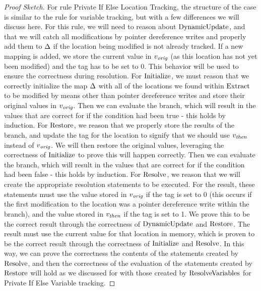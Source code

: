 \begin{proof}[Proof Sketch]
For rule Private If Else Location Tracking, the structure of the case is similar to the rule for variable tracking, but with a few differences we will discuss here. 
For this rule, we will need to reason about $\mathrm{DynamicUpdate}$, and that we will catch all modifications by pointer dereference writes and properly add them to $\Delta$ if the location being modified is not already tracked. If a new mapping is added, we store the current value in $v_\mathit{orig}$ (as this location has not yet been modified) and the tag has to be set to 0. This behavior will be used to ensure the correctness during resolution.
For $\mathrm{ Initialize}$, we must reason that we correctly initialize the map $\Delta$ with all of the locations we found within $\mathrm{ Extract}$ to be modified by means other than pointer dereference writes and store their original values in $v_\mathit{orig}$. 
Then we can evaluate the  branch, which will result in the values that are correct for if the condition had been true - this holds by induction. 
For $\mathrm{ Restore}$, we reason that we properly store the results of the  branch, and update the tag for the location to signify that we should use $v_\mathit{then}$ instead of $v_\mathit{orig}$. We will then restore the original values, leveraging the correctness of $\mathrm{ Initialize}$ to prove this will happen correctly. 
Then we can evaluate the  branch, which will result in the values that are correct for if the condition had been false - this holds by induction. 
For $\mathrm{ Resolve}$, we reason that we will create the appropriate resolution statements to be executed. For the  result, these statements must use the value stored in $v_\mathit{orig}$ if the tag is set to 0 (this occurs if the first modification to the location was a pointer dereference write within the  branch), and the value stored in $v_\mathit{then}$ if the tag is set to 1. We prove this to be the correct  result through the correctness of $\mathrm{DynamicUpdate}$ and $\mathrm{ Restore}$. The  result must use the current value for that location in memory, which is proven to be the correct  result through the correctness of $\mathrm{ Initialize}$ and $\mathrm{ Resolve}$. In this way, we can prove the correctness the contents of the statements created by $\mathrm{ Resolve}$, and then the correctness of the evaluation of the statements created by $\mathrm{ Restore}$ will hold as we discussed for with those created by $\mathrm{ResolveVariables}$ for Private If Else Variable tracking. 
\end{proof}




